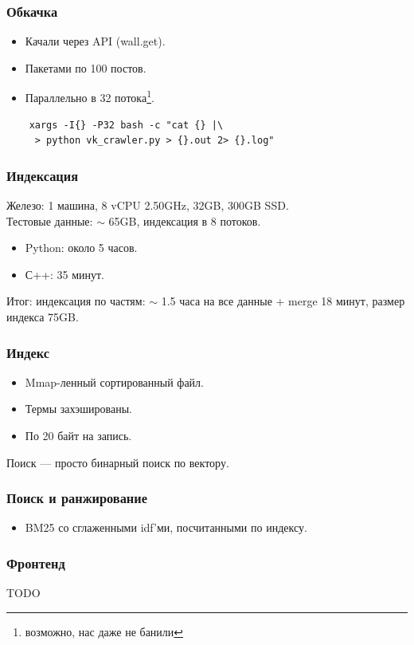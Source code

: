 \documentclass{beamer}
\begin{document}
\begin{frame}[fragile]
  \frametitle{Обкачка}
    \begin{itemize}
      \item Качали через API (wall.get).
      \item Пакетами по 100 постов.
      \item Параллельно в 32 потока\footnote{возможно, нас даже не банили}.
    \end{itemize}

  \begin{verbatim}
    xargs -I{} -P32 bash -c "cat {} |\
     > python vk_crawler.py > {}.out 2> {}.log"
  \end{verbatim}

\end{frame}

\begin{frame}
  \frametitle{Индексация}
    Железо: 1 машина, 8 vCPU 2.50GHz, 32GB, 300GB SSD. \\
    Тестовые данные: $\sim$ 65GB, индексация в 8 потоков.
    \begin{itemize}
      \item Python: около 5 часов.
      \item С++: 35 минут.
    \end{itemize}
    Итог: индексация по частям: $\sim$ 1.5 часа на все данные + merge 18 минут,
      размер индекса 75GB.
\end{frame}

\begin{frame}
  \frametitle{Индекс}
    \begin{itemize}
      \item Mmap-ленный сортированный файл.
      \item Термы захэшированы.
      \item По 20 байт на запись.
    \end{itemize}

    Поиск --- просто бинарный поиск по вектору.
\end{frame}

\begin{frame}
  \frametitle{Поиск и ранжирование}
  \begin{itemize}
    \item BM25 со сглаженными idf'ми, посчитанными по индексу.
  \end{itemize}
\end{frame}

\begin{frame}
  \frametitle{Фронтенд}
    TODO
\end{frame}
\end{document}
